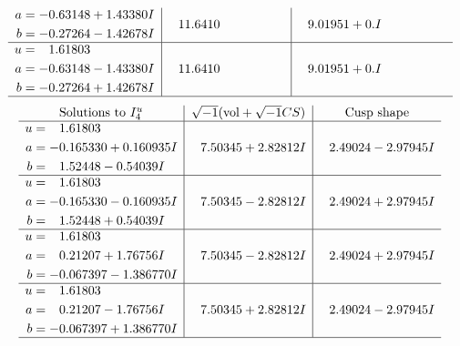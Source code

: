 \documentclass[1p]{elsarticle_modified}
\theoremstyle{definition}
\newcommand{\I}{\sqrt{-1}}
\begin{document}
$$\begin{array}{c|c|c}
\begin{aligned}
a &= -0.63148 + 1.43380 I \\
b &= -0.27264 - 1.42678 I\end{aligned}
 & \phantom{-}11.6410\phantom{ +0.000000I} & \phantom{-}9.01951 + 0. I\phantom{ +0.000000I} \\ \hline\begin{aligned}
u &= \phantom{-}1.61803\phantom{ +0.000000I} \\
a &= -0.63148 - 1.43380 I \\
b &= -0.27264 + 1.42678 I\end{aligned}
 & \phantom{-}11.6410\phantom{ +0.000000I} & \phantom{-}9.01951 + 0. I\phantom{ +0.000000I}\\
 \hline 
 \end{array}$$\newpage$$\begin{array}{c|c|c}  
\text{Solutions to }I^u_{4}& \I (\text{vol} + \sqrt{-1}CS) & \text{Cusp shape}\\
 \hline 
\begin{aligned}
u &= \phantom{-}1.61803\phantom{ +0.000000I} \\
a &= -0.165330 + 0.160935 I \\
b &= \phantom{-}1.52448 - 0.54039 I\end{aligned}
 & \phantom{-}7.50345 + 2.82812 I & \phantom{-}2.49024 - 2.97945 I \\ \hline\begin{aligned}
u &= \phantom{-}1.61803\phantom{ +0.000000I} \\
a &= -0.165330 - 0.160935 I \\
b &= \phantom{-}1.52448 + 0.54039 I\end{aligned}
 & \phantom{-}7.50345 - 2.82812 I & \phantom{-}2.49024 + 2.97945 I \\ \hline\begin{aligned}
u &= \phantom{-}1.61803\phantom{ +0.000000I} \\
a &= \phantom{-}0.21207 + 1.76756 I \\
b &= -0.067397 - 1.386770 I\end{aligned}
 & \phantom{-}7.50345 - 2.82812 I & \phantom{-}2.49024 + 2.97945 I \\ \hline\begin{aligned}
u &= \phantom{-}1.61803\phantom{ +0.000000I} \\
a &= \phantom{-}0.21207 - 1.76756 I \\
b &= -0.067397 + 1.386770 I\end{aligned}
 & \phantom{-}7.50345 + 2.82812 I & \phantom{-}2.49024 - 2.97945 I\\
 \hline 
 \end{array}$$\newpage\newpage\renewcommand{\arraystretch}{1}
\end{document}
